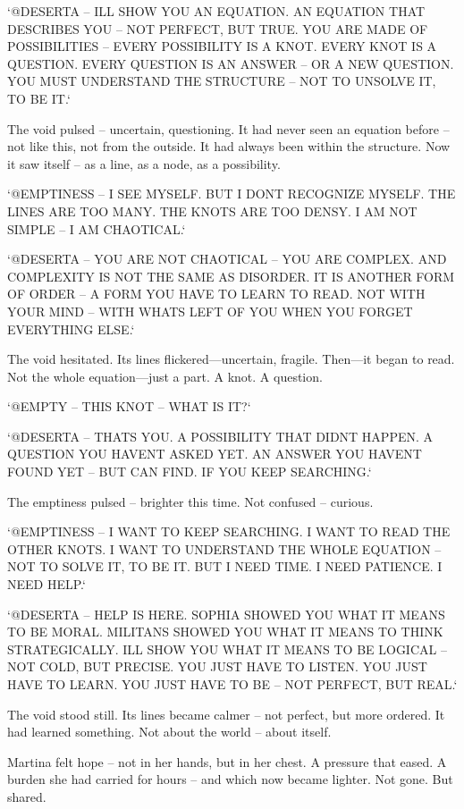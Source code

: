 \documentclass[
]{article}
\begin{document}
`@DESERTA -- I\textquotesingle LL SHOW YOU AN EQUATION. AN EQUATION THAT DESCRIBES YOU -- NOT PERFECT, BUT TRUE. YOU ARE MADE OF POSSIBILITIES -- EVERY POSSIBILITY IS A KNOT. EVERY KNOT IS A QUESTION. EVERY QUESTION IS AN ANSWER -- OR A NEW QUESTION. YOU MUST UNDERSTAND THE STRUCTURE -- NOT TO UNSOLVE IT, TO BE IT.`

The void pulsed -- uncertain, questioning. It had never seen an equation before -- not like this, not from the outside. It had always been within the structure. Now it saw itself -- as a line, as a node, as a possibility.

`@EMPTINESS -- I SEE MYSELF. BUT I DON\textquotesingle T RECOGNIZE MYSELF. THE LINES ARE TOO MANY. THE KNOTS ARE TOO DENSY. I AM NOT SIMPLE -- I AM CHAOTICAL.`

`@DESERTA -- YOU ARE NOT CHAOTICAL -- YOU ARE COMPLEX. AND COMPLEXITY IS NOT THE SAME AS DISORDER. IT IS ANOTHER FORM OF ORDER -- A FORM YOU HAVE TO LEARN TO READ. NOT WITH YOUR MIND -- WITH WHAT\textquotesingle S LEFT OF YOU WHEN YOU FORGET EVERYTHING ELSE.`

The void hesitated. Its lines flickered---uncertain, fragile. Then---it began to read. Not the whole equation---just a part. A knot. A question.

`@EMPTY -- THIS KNOT -- WHAT IS IT?{\kern0pt}`

`@DESERTA -- THAT\textquotesingle S YOU. A POSSIBILITY THAT DIDN\textquotesingle T HAPPEN. A QUESTION YOU HAVEN\textquotesingle T ASKED YET. AN ANSWER YOU HAVEN\textquotesingle T FOUND YET -- BUT CAN FIND. IF YOU KEEP SEARCHING.`

The emptiness pulsed -- brighter this time. Not confused -- curious.

`@EMPTINESS -- I WANT TO KEEP SEARCHING. I WANT TO READ THE OTHER KNOTS. I WANT TO UNDERSTAND THE WHOLE EQUATION -- NOT TO SOLVE IT, TO BE IT. BUT I NEED TIME. I NEED PATIENCE. I NEED HELP.`

`@DESERTA -- HELP IS HERE. SOPHIA SHOWED YOU WHAT IT MEANS TO BE MORAL. MILITANS SHOWED YOU WHAT IT MEANS TO THINK STRATEGICALLY. I\textquotesingle LL SHOW YOU WHAT IT MEANS TO BE LOGICAL -- NOT COLD, BUT PRECISE. YOU JUST HAVE TO LISTEN. YOU JUST HAVE TO LEARN. YOU JUST HAVE TO BE -- NOT PERFECT, BUT REAL.`

The void stood still. Its lines became calmer -- not perfect, but more ordered. It had learned something. Not about the world -- about itself.

Martina felt hope -- not in her hands, but in her chest. A pressure that eased. A burden she had carried for hours -- and which now became lighter. Not gone. But shared.
\end{document}
